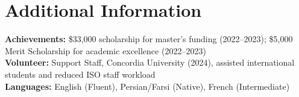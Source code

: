 \documentclass[a4,10pt]{article}
\begin{document}

\section*{Additional Information}
\textbf{Achievements:} \$33,000 scholarship for master’s funding (2022–2023); \$5,000 Merit Scholarship for academic excellence (2022–2023) \\
\textbf{Volunteer:} Support Staff, Concordia University (2024), assisted international students and reduced ISO staff workload \\
\textbf{Languages:} English (Fluent), Persian/Farsi (Native), French (Intermediate)

\end{document}
